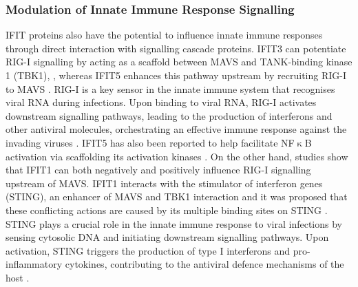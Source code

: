 \subsubsection{Modulation of Innate Immune Response Signalling} \label{Modulation of Innate Immune Response Signalling}
IFIT proteins also have the potential to influence innate immune responses through direct interaction with signalling cascade proteins. IFIT3 can potentiate RIG-I signalling by acting as a scaffold between MAVS and TANK-binding kinase 1 (TBK1), \cite{Liu2011IFN-InducedTBK1}, whereas IFIT5 enhances this pathway upstream by recruiting RIG-I to MAVS \cite{Zhang2013IFIT5Pathways}. RIG-I is a key sensor in the innate immune system that recognises viral RNA during infections. Upon binding to viral RNA, RIG-I activates downstream signalling pathways, leading to the production of interferons and other antiviral molecules, orchestrating an effective immune response against the invading viruses \cite{Thoresen2021TheSignaling}. IFIT5 has also been reported to help facilitate NF$\upkappa$B activation via scaffolding its activation kinases \cite{Zhang2013IFIT5Pathways}. On the other hand, studies show that IFIT1 can both negatively and positively influence RIG-I signalling upstream of MAVS. IFIT1 interacts with the stimulator of interferon genes (STING), an enhancer of MAVS and TBK1 interaction and it was proposed that these conflicting actions are caused by its multiple binding sites on STING \cite{Li2009ISG56Response, Reynaud2015IFIT1Interferon}. STING plays a crucial role in the innate immune response to viral infections by sensing cytosolic DNA and initiating downstream signalling pathways. Upon activation, STING triggers the production of type I interferons and pro-inflammatory cytokines, contributing to the antiviral defence mechanisms of the host \cite{Barber2015STING:Cancer}.

